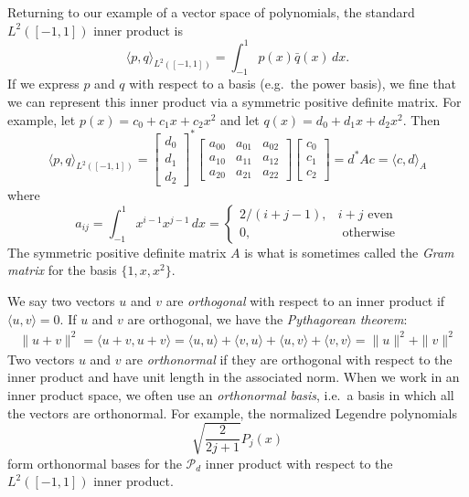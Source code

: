 \documentclass[12pt, leqno]{article}
\begin{document}
Returning to our example of a vector space of polynomials,
the standard $L^2([-1,1])$ inner product is
\[
  \langle p, q \rangle_{L^2([-1,1])} = \int_{-1}^1 p(x) \bar{q}(x) \, dx.
\]
If we express $p$ and $q$ with respect to a basis (e.g.~the power
basis), we fine that we can represent this inner product via a
symmetric positive definite matrix.  For example,
let $p(x) = c_0 + c_1 x + c_2 x^2$ and let
$q(x) = d_0 + d_1 x + d_2 x^2$.  Then
\[
  \langle p, q \rangle_{L^2([-1,1])} =
  \begin{bmatrix} d_0 \\ d_1 \\ d_2 \end{bmatrix}^*
  \begin{bmatrix}
    a_{00} & a_{01} & a_{02} \\
    a_{10} & a_{11} & a_{12} \\
    a_{20} & a_{21} & a_{22}
  \end{bmatrix}
  \begin{bmatrix} c_0 \\ c_1 \\ c_2 \end{bmatrix} =
  d^* A c = \langle c, d \rangle_A
\]
where
\[
a_{ij} = \int_{-1}^1 x^{i-1} x^{j-1} \, dx =
\begin{cases}
  2/(i+j-1), & i+j \mbox{ even} \\
  0, & \mbox{ otherwise}
\end{cases}
\]
The symmetric positive definite matrix $A$ is what is sometimes called
the {\em Gram matrix} for the basis $\{1, x, x^2\}$.

We say two vectors $u$ and $v$ are {\em orthogonal} with respect to an
inner product if $\langle u, v \rangle = 0$.  If $u$ and $v$ are
orthogonal, we have the {\em Pythagorean theorem}:
\begin{align*}
  \|u+v\|^2
  = \langle u + v, u + v \rangle
  = \langle u, u \rangle + \langle v, u \rangle + \langle u, v \rangle
  + \langle v, v \rangle
  = \|u\|^2 + \|v\|^2
\end{align*}
Two vectors $u$ and $v$ are {\em orthonormal} if they are orthogonal
with respect to the inner product and have unit length in the associated
norm.  When we work in an inner product space, we often use an
{\em orthonormal basis}, i.e.~a basis in which all the vectors are
orthonormal.  For example, the normalized Legendre polynomials
\[
  \sqrt{\frac{2}{2j+1}} P_j(x)
\]
form orthonormal bases for the $\mathcal{P}_d$ inner product with
respect to the $L^2([-1,1])$ inner product.
\end{document}
